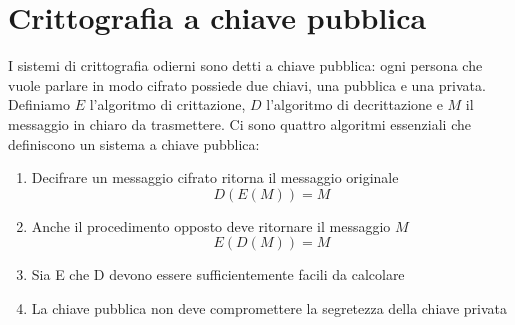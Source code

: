 \documentclass[italian,A4,12pt]{article}
\begin{document}
  \section{Crittografia a chiave pubblica}
    I sistemi di crittografia odierni sono detti a chiave pubblica: ogni persona che vuole parlare in modo cifrato possiede due chiavi, una pubblica e una privata.\\
    Definiamo $E$ l'algoritmo di crittazione, $D$ l'algoritmo di decrittazione e $M$ il messaggio in chiaro da trasmettere. Ci sono quattro algoritmi essenziali che definiscono un sistema a chiave pubblica:
    \begin{enumerate}[label=(\alph*)]
      \item Decifrare un messaggio cifrato ritorna il messaggio originale $$D(E(M))=M$$
      \item Anche il procedimento opposto deve ritornare il messaggio $M$ $$E(D(M))=M$$
      \item Sia E che D devono essere sufficientemente facili da calcolare
      \item La chiave pubblica non deve compromettere la segretezza della chiave privata
    \end{enumerate}
\end{document}
